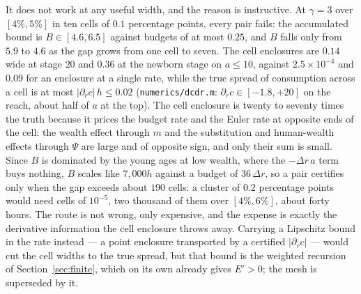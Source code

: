 It does not work at any useful width, and the reason is instructive. At $\gamma=3$ over
$[4\%,5\%]$ in ten cells of $0.1$ percentage points, every pair fails: the accumulated bound is
$B\in[4.6,6.5]$ against budgets of at most $0.25$, and $B$ falls only from $5.9$ to $4.6$ as the
gap grows from one cell to seven. The cell enclosures are $0.14$ wide at stage $20$ and $0.36$ at
the newborn stage on $a\le10$, against $2.5\times10^{-4}$ and $0.09$ for an enclosure at a single
rate, while the true spread of consumption across a cell is at most $|\partial_rc|\,h\le0.02$
(\texttt{numerics/dcdr.m}: $\partial_rc\in[-1.8,+20]$ on the reach, about half of $a$ at the top).
The cell enclosure is twenty to seventy times the truth because it prices the budget rate and the
Euler rate at opposite ends of the cell: the wealth effect through $m$ and the substitution and
human-wealth effects through $\Psi$ are large and of opposite sign, and only their sum is small.
Since $B$ is dominated by the young ages at low wealth, where the $-\Delta r\,a$ term buys nothing,
$B$ scales like $7{,}000h$ against a budget of $36\,\Delta r$, so a pair certifies only when the gap
exceeds about $190$ cells: a cluster of $0.2$ percentage points would need cells of
$10^{-5}$, two thousand of them over $[4\%,6\%]$, about forty hours. The route is not wrong, only
expensive, and the expense is exactly the derivative information the cell enclosure throws away.
Carrying a Lipschitz bound in the rate instead --- a point enclosure transported by a certified
$|\partial_rc|$ --- would cut the cell widths to the true spread, but that bound is the weighted
recursion of Section~\ref{sec:finite}, which on its own already gives $E'>0$; the mesh is
superseded by it.


